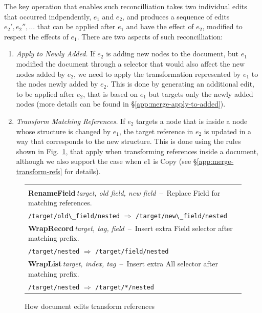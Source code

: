 \documentclass[sigconf,anonymous,screen]{acmart}
\newcommand{\ident}[1]{{\sffamily #1}}
\begin{document}
The key operation that enables such reconcilliation takes two individual edits that occurred
indpendently, $e_1$ and $e_2$, and produces a sequence of edits $e_2', e_2'', \ldots$ that
can be applied after $e_1$ and have the effect of $e_2$, modified to respect the effects of $e_1$.
There are two aspects of such reconcilliation:

\begin{enumerate}
\item \emph{Apply to Newly Added.} If $e_2$ is adding new nodes to the document, but
  $e_1$ modified the document through a selector that would also affect the new nodes added by $e_2$,
  we need to apply the transformation represented by $e_1$ to the nodes newly added by $e_2$.
  This is done by generating an additional edit, to be applied after $e_2$, that is based on
  $e_1$ but targets only the newly added nodes (more details can be found in \S\ref{app:merge-apply-to-added}).

\item \emph{Transform Matching References.} If $e_2$ targets a node that is inside a node
  whose structure is changed by $e_1$, the target reference in $e_2$ is updated in a way that
  corresponds to the new structure. This is done using the rules shown in Fig.~\ref{fig:updates},
  that apply when transforming references inside a document, although we also support the case
  when $e1$ is \ident{Copy} (see \S\ref{app:merge-transform-refs} for details).
\end{enumerate}


\begin{figure}
\newcommand{\tttablecol}[5]{
\small{\bfseries #1}\;\,\footnotesize\textit{#2}\,\; --\,\; #5\\[-0.1em]
\quad \footnotesize #3 \;\;$\Rightarrow$\;\; #4 \\[0.3em]
}
\begin{tabular}{|p{27em}|}
\hline
\\[-1em]
\tttablecol{RenameField}{target, old field, new field}{\Verb|/target/old\_field/nested|}{\Verb|/target/new\_field/nested|}
  {Replace Field for matching references.}
\tttablecol{WrapRecord}{target, tag, field}{\Verb|/target/nested|}{\Verb|/target/field/nested|}
  {Insert extra Field selector after matching prefix.}
\tttablecol{WrapList}{target, index, tag}{\Verb|/target/nested|}{\Verb|/target/*/nested|}
  {Insert extra All selector after matching prefix.}
\hline
\end{tabular}
\vspace{-0.5em}
\caption{How document edits transform references}
\label{fig:updates}
\vspace{-1em}
\end{figure}
\end{document}
